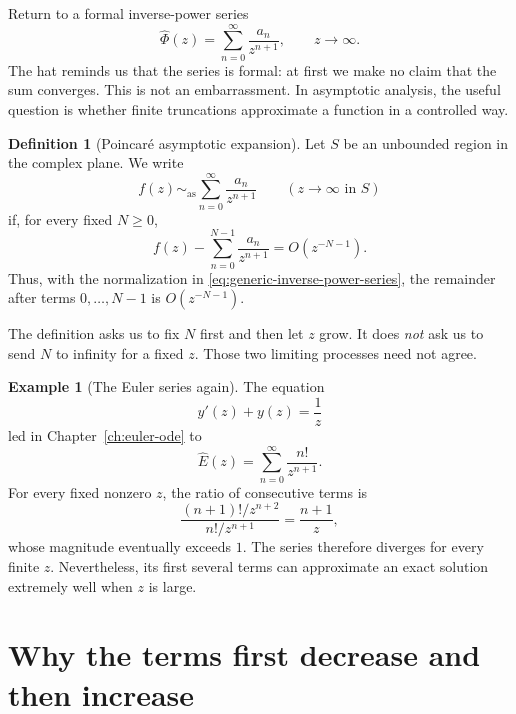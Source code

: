 \documentclass[11pt,oneside]{book}
\theoremstyle{definition}
\newtheorem{definition}[theorem]{Definition}
\newtheorem{example}[theorem]{Example}
\theoremstyle{remark}
\newcommand{\asympseries}{\sim_{\!\mathrm{as}}}
\newcommand{\bigO}{O}
\newcommand{\phihat}{\widehat{\Phi}}
\begin{document}
Return to a formal inverse-power series
\begin{equation}
  \phihat(z)=\sum_{n=0}^{\infty}\frac{a_n}{z^{n+1}},
  \qquad z\to\infty.
  \label{eq:generic-inverse-power-series}
\end{equation}
The hat reminds us that the series is formal: at first we make no claim that the
sum converges. This is not an embarrassment. In asymptotic analysis, the useful
question is whether finite truncations approximate a function in a controlled
way.

\begin{definition}[Poincar\'e asymptotic expansion]
Let $S$ be an unbounded region in the complex plane. We write
\[
  f(z)\asympseries \sum_{n=0}^{\infty}\frac{a_n}{z^{n+1}}
  \qquad (z\to\infty\text{ in }S)
\]
if, for every fixed $N\ge0$,
\[
  f(z)-\sum_{n=0}^{N-1}\frac{a_n}{z^{n+1}}
  =\bigO\!\left(z^{-N-1}\right).
\]
Thus, with the normalization in \eqref{eq:generic-inverse-power-series}, the
remainder after terms $0,\ldots,N-1$ is $\bigO(z^{-N-1})$.
\end{definition}

The definition asks us to fix $N$ first and then let $z$ grow. It does
\emph{not} ask us to send $N$ to infinity for a fixed $z$. Those two limiting
processes need not agree.

\begin{example}[The Euler series again]
The equation
\[
  y'(z)+y(z)=\frac1z
\]
led in Chapter~\ref{ch:euler-ode} to
\begin{equation}
  \widehat E(z)=\sum_{n=0}^{\infty}\frac{n!}{z^{n+1}}.
  \label{eq:euler-series-resurgence}
\end{equation}
For every fixed nonzero $z$, the ratio of consecutive terms is
\[
  \frac{(n+1)!/z^{n+2}}{n!/z^{n+1}}=\frac{n+1}{z},
\]
whose magnitude eventually exceeds $1$. The series therefore diverges for every
finite $z$. Nevertheless, its first several terms can approximate an exact
solution extremely well when $z$ is large.
\end{example}

\section{Why the terms first decrease and then increase}
\end{document}
